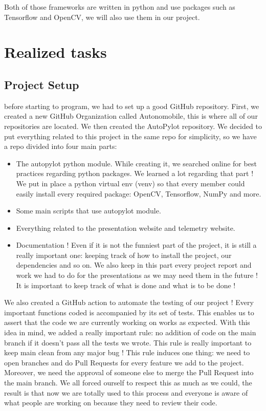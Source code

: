 \documentclass[12pt]{article}
\begin{document}
Both of those frameworks are written in python and use packages such as Tensorflow and OpenCV, we will also use them in our project.
\newpage



\section{Realized tasks}

\subsection{Project Setup}
before starting to program, we had to set up a good GitHub repository. First, we created a new GitHub Organization called Autonomobile, this is where all of our repositories are located. We then created the AutoPylot repository. We decided to put everything related to this project in the same repo for simplicity, so we have a repo divided into four main parts:
\begin{itemize}
\item The autopylot python module. While creating it, we searched online for best practices regarding python packages. We learned a lot regarding that part ! We put in place a python virtual env (venv) so that every member could easily install every required package: OpenCV, Tensorflow, NumPy and more.
\item Some main scripts that use autopylot module.
\item Everything related to the presentation website and telemetry website.
\item Documentation ! Even if it is not the funniest part of the project, it is still a really important one: keeping track of how to install the project, our dependencies and so on. We also keep in this part every project report and work we had to do for the presentations as we may need them in the future ! It is important to keep track of what is done and what is to be done !
\end{itemize}
We also created a GitHub action to automate the testing of our project ! Every important functions coded is accompanied by its set of tests. This enables us to assert that the code we are currently working on works as expected. With this idea in mind, we added a really important rule: no addition of code on the main branch if it doesn't pass all the tests we wrote. This rule is really important to keep main clean from any major bug ! This rule induces one thing: we need to open branches and do Pull Requests for every feature we add to the project. Moreover, we need the approval of someone else to merge the Pull Request into the main branch. We all forced ourself to respect this as much as we could, the result is that now we are totally used to this process and everyone is aware of what people are working on because they need to review their code.
\end{document}
